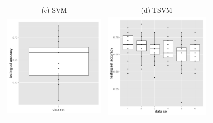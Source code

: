 \begin{figure}
\begin{centering}
\begin{tabular}{cc}
(c) SVM & (d) TSVM\tabularnewline
\includegraphics[width=0.34\paperwidth]{images/breast_cancer_12-svm-accuracies-learn-training_validation.pdf} & \includegraphics[width=0.34\paperwidth]{images/breast_cancer_12-svmlight-accuracies-learn_training_validation.pdf}\tabularnewline

\end{tabular}
\end{centering}
\end{figure}
